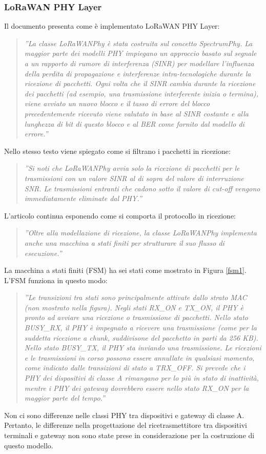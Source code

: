 \documentclass[a4paper]{report} %
\begin{document}
\subsubsection{LoRaWAN PHY Layer}
Il documento \cite{art:rif.49} presenta come è implementato LoRaWAN PHY Layer:
\begin{quote}
	\textit{''La classe LoRaWANPhy è stata costruita sul concetto SpectrumPhy. La maggior parte dei modelli PHY impiegano un approccio basato sul segnale a un rapporto di rumore di interferenza (SINR) per modellare l'influenza della perdita di propagazione e interferenze intra-tecnologiche durante la ricezione di pacchetti. Ogni volta che il SINR cambia durante la ricezione dei pacchetti (ad esempio, una trasmissione interferente inizia o termina), viene avviato un nuovo blocco e il tasso di errore del blocco precedentemente ricevuto viene valutato in base al SINR costante e alla lunghezza di bit di questo blocco e al BER come fornito dal modello di errore.''}
\end{quote}
Nello stesso testo viene spiegato come si filtrano i pacchetti in ricezione:
\begin{quote}
	\textit{''Si noti che LoRaWANPhy avvia solo la ricezione di pacchetti per le trasmissioni con un valore SINR al di sopra del valore di interruzione SNR. Le trasmissioni entranti che cadono sotto il valore di cut-off vengono immediatamente eliminate dal PHY.''}
\end{quote}
L'articolo continua esponendo come si comporta il protocollo in ricezione:
\begin{quote}
	\textit{''Oltre alla modellazione di ricezione, la classe LoRaWANPhy implementa anche una macchina a stati finiti per strutturare il suo flusso di esecuzione.''}
\end{quote}
La macchina a stati finiti (FSM) ha sei stati come mostrato in Figura \ref{fsm1}. L'FSM funziona in questo modo:
\begin{quote}
	\textit{''Le transizioni tra stati sono principalmente attivate dallo strato MAC (non mostrato nella figura). Negli stati RX\_ON e TX\_ON, il PHY è pronto ad avviare una ricezione o trasmissione di pacchetti. Nello stato BUSY\_RX, il PHY è impegnato a ricevere una trasmissione (come per la suddetta ricezione a chunk, suddivisone del pacchetto in parti da 256 KB). Nello stato BUSY\_TX, il PHY sta inviando una trasmissione. Le ricezioni e le trasmissioni in corso possono essere annullate in qualsiasi momento, come indicato dalle transizioni di stato a TRX\_OFF. Si prevede che i PHY dei dispositivi di classe A rimangano per lo più in stato di inattività, mentre i PHY dei gateway dovrebbero essere nello stato RX\_ON per la maggior parte del tempo.''}
\end{quote}
Non ci sono differenze nelle classi PHY tra dispositivi e gateway di classe A. Pertanto, le differenze nella progettazione del ricetrasmettitore tra dispositivi terminali e gateway non sono state prese in considerazione per la costruzione di questo modello.
\end{document}

